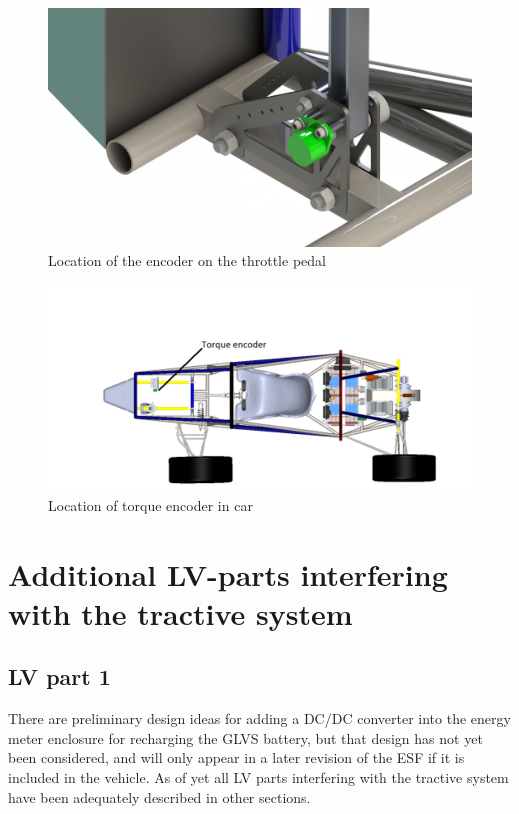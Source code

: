 \documentclass{article}
\begin{document}
\begin{figure}[H]
    \centering
    \includegraphics[width=\linewidth]{encoder_mount}
    \caption{Location of the encoder on the throttle pedal}
    \label{fig:encoder_mount}
\end{figure}

\begin{figure}[H]
    \centering
    \includegraphics[width=\linewidth]{encoder_car_location}
    \caption{Location of torque encoder in car} 
    \label{fig:encoder_car}
\end{figure}


\section{Additional LV-parts interfering with the tractive system}
\subsection{LV part 1}
There are preliminary design ideas for adding a DC/DC converter into the energy meter enclosure for recharging the GLVS battery, but that design has not yet been considered, and will only appear in a later revision of the ESF if it is included in the vehicle. As of yet all LV parts interfering with the tractive system have been adequately described in other sections.
\end{document}
